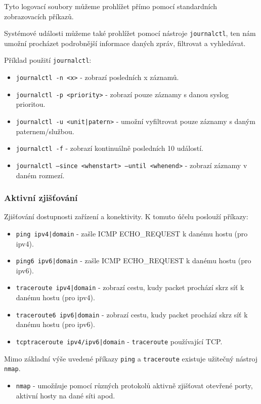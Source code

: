 Tyto logovací soubory můžeme prohlížet přímo pomocí standardních zobrazovacích příkazů.

Systémové události můžeme také prohlížet pomocí nástroje \texttt{journalctl}, ten nám umožní procházet podrobnější informace daných zpráv, filtrovat a vyhledávat.

Příklad použití \texttt{journalctl}:
\begin{itemize}
				\item \texttt{journalctl -n <x>} - zobrazí posledních x záznamů.
				\item \texttt{journalctl -p <priority>} - zobrazí pouze záznamy s danou syslog prioritou.
				\item \texttt{journalctl -u <unit|patern>} - umožní vyfiltrovat pouze záznamy s daným paternem/službou.
				\item \texttt{journalctl -f} - zobrazí kontinuálně posledních 10 událostí.
				\item \texttt{journalctl --since <whenstart> --until <whenend>} - zobrazí záznamy v daném rozmezí.
\end{itemize}


\subsubsection{Aktivní zjišťování}
Zjišťování dostupnosti zařízení a konektivity. K tomuto účelu poslouží příkazy:

\begin{itemize}
				\item \texttt{ping ipv4|domain} - zašle ICMP ECHO\_REQUEST k danému hostu (pro ipv4).
				\item \texttt{ping6 ipv6|domain} - zašle ICMP ECHO\_REQUEST k danému hostu (pro ipv6).
				\item \texttt{traceroute ipv4|domain} - zobrazí cestu, kudy packet prochází skrz síť k danému hostu (pro ipv4).
				\item \texttt{traceroute6 ipv6|domain} - zobrazí cestu, kudy packet prochází skrz síť k danému hostu (pro ipv6).
				\item \texttt{tcptraceroute ipv4/ipv6|domain} - \texttt{traceroute} používající TCP.
\end{itemize}

Mimo základní výše uvedené příkazy \texttt{ping} a \texttt{traceroute}
existuje užitečný nástroj \texttt{nmap}.

\begin{itemize}
				\item \texttt{nmap} - umožňuje pomocí různých protokolů aktivně zjišťovat otevřené porty, aktivní hosty na dané síti apod.
\end{itemize}


